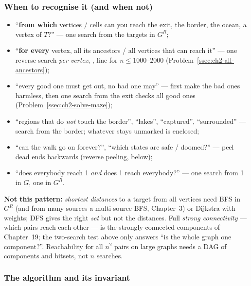 \subsubsection*{When to recognise it (and when not)}

\begin{itemize}[leftmargin=*]
    \item ``\textbf{from which} vertices / cells can you reach the exit, the border, the ocean, a vertex of $T$?'' --- one search from the targets in $G^R$;
    \item ``\textbf{for every} vertex, all its ancestors / all vertices that can reach it'' --- one reverse search \emph{per vertex}, , fine for $n \le 1000$--$2000$ (Problem~\ref{ssec:ch2-all-ancestors});
    \item ``every good one must get out, no bad one may'' --- first make the bad ones harmless, then one search from the exit checks all good ones (Problem~\ref{ssec:ch2-solve-maze});
    \item ``regions that do \emph{not} touch the border'', ``lakes'', ``captured'', ``surrounded'' --- search from the border; whatever stays unmarked is enclosed;
    \item ``can the walk go on forever?'', ``which states are safe / doomed?'' --- peel dead ends backwards (reverse peeling, below);
    \item ``does everybody reach 1 \emph{and} does 1 reach everybody?'' --- one search from 1 in $G$, one in $G^R$.
\end{itemize}
\textbf{Not this pattern:} \emph{shortest distances} to a target from all vertices need BFS in $G^R$ (and from many sources a multi-source BFS, Chapter~3) or Dijkstra with weights; DFS gives the right \emph{set} but not the distances. Full \emph{strong connectivity} --- which pairs reach each other --- is the strongly connected components of Chapter~19; the two-search test above only answers ``is the whole graph one component?''. Reachability for all $n^2$ pairs on large graphs needs a DAG of components and bitsets, not $n$ searches.

\subsubsection*{The algorithm and its invariant}

